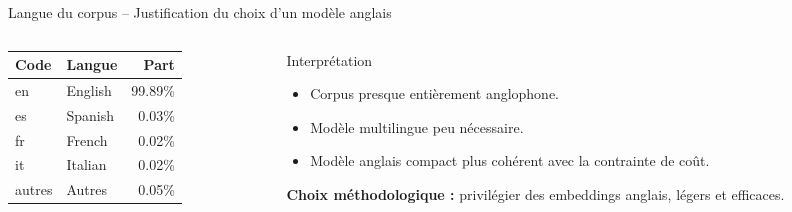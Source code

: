 \documentclass[11pt,aspectratio=169]{beamer}
\begin{document}
\begin{frame}{Langue du corpus -- Justification du choix d'un modèle anglais}
\small
\begin{columns}
\begin{column}{0.48\textwidth}
\begin{table}
\centering
\renewcommand{\arraystretch}{1.2}
\begin{tabular}{llr}
\toprule
\textbf{Code} & \textbf{Langue} & \textbf{Part} \\
\midrule
en & English & 99.89\% \\
es & Spanish & 0.03\% \\
fr & French & 0.02\% \\
it & Italian & 0.02\% \\
autres & Autres & 0.05\% \\
\bottomrule
\end{tabular}
\end{table}
\end{column}

\begin{column}{0.49\textwidth}
\begin{block}{Interprétation}
\begin{itemize}
    \item Corpus presque entièrement anglophone.
    \item Modèle multilingue peu nécessaire.
    \item Modèle anglais compact plus cohérent avec la contrainte de coût.
\end{itemize}
\end{block}

\begin{takeawaybox}
\centering
\textbf{Choix méthodologique :} privilégier des embeddings anglais, légers et efficaces.
\end{takeawaybox}
\end{column}
\end{columns}
\end{frame}
\end{document}
